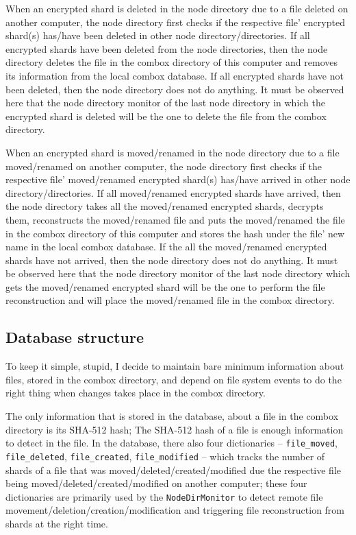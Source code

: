 When an encrypted shard is deleted in the node directory due to a file
deleted on another computer, the node directory first checks if the
respective file' encrypted shard(s) has/have been deleted in other
node directory/directories. If all encrypted shards have been deleted
from the node directories, then the node directory deletes the file in
the combox directory of this computer and removes its information from
the local combox database. If all encrypted shards have not been
deleted, then the node directory does not do anything. It must be
observed here that the node directory monitor of the last node
directory in which the encrypted shard is deleted will be the one to
delete the file from the combox directory.

When an encrypted shard is moved/renamed in the node directory due to
a file moved/renamed on another computer, the node directory first
checks if the respective file' moved/renamed encrypted shard(s)
has/have arrived in other node directory/directories. If all
moved/renamed encrypted shards have arrived, then the node directory
takes all the moved/renamed encrypted shards, decrypts them,
reconstructs the moved/renamed file and puts the moved/renamed the file
in the combox directory of this computer and stores the hash under the
file' new name in the local combox database. If the all the
moved/renamed encrypted shards have not arrived, then the node
directory does not do anything. It must be observed here that the node
directory monitor of the last node directory which gets the
moved/renamed encrypted shard will be the one to perform the file
reconstruction and will place the moved/renamed file in the combox
directory.

\subsection{Database structure}\label{sec:4-combox-db}

To keep it simple, stupid, I decide to maintain bare minimum
information about files, stored in the combox directory, and depend on
file system events to do the right thing when changes takes place in
the combox directory.

The only information that is stored in the database, about a file in
the combox directory is its SHA-512 hash; The SHA-512 hash of a file
is enough information to detect in the file. In the database, there
also four dictionaries -- \verb+file_moved+, \verb+file_deleted+,
\verb+file_created+, \verb+file_modified+ -- which tracks the number
of shards of a file that was moved/deleted/created/modified due the
respective file being moved/deleted/created/modified on another
computer; these four dictionaries are primarily used by the
\verb+NodeDirMonitor+ to detect remote file
movement/deletion/creation/modification and triggering file
reconstruction from shards at the right time.

